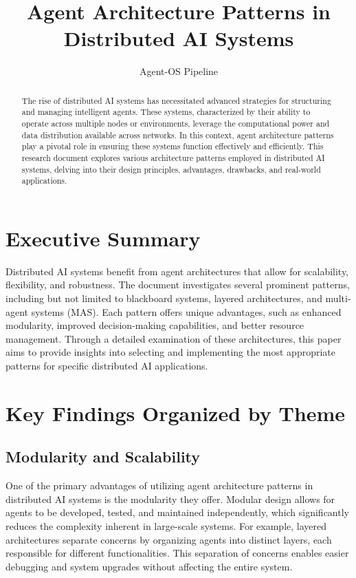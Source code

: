 \documentclass{article}
\title{Agent Architecture Patterns in Distributed AI Systems}
\author{Agent-OS Pipeline}
\begin{document}
\maketitle

\begin{abstract}
The rise of distributed AI systems has necessitated advanced strategies for structuring and managing intelligent agents. These systems, characterized by their ability to operate across multiple nodes or environments, leverage the computational power and data distribution available across networks. In this context, agent architecture patterns play a pivotal role in ensuring these systems function effectively and efficiently. This research document explores various architecture patterns employed in distributed AI systems, delving into their design principles, advantages, drawbacks, and real-world applications.
\end{abstract}

\section{Executive Summary}
Distributed AI systems benefit from agent architectures that allow for scalability, flexibility, and robustness. The document investigates several prominent patterns, including but not limited to blackboard systems, layered architectures, and multi-agent systems (MAS). Each pattern offers unique advantages, such as enhanced modularity, improved decision-making capabilities, and better resource management. Through a detailed examination of these architectures, this paper aims to provide insights into selecting and implementing the most appropriate patterns for specific distributed AI applications.

\section{Key Findings Organized by Theme}

\subsection{Modularity and Scalability}
One of the primary advantages of utilizing agent architecture patterns in distributed AI systems is the modularity they offer. Modular design allows for agents to be developed, tested, and maintained independently, which significantly reduces the complexity inherent in large-scale systems. For example, layered architectures separate concerns by organizing agents into distinct layers, each responsible for different functionalities. This separation of concerns enables easier debugging and system upgrades without affecting the entire system.
\end{document}
